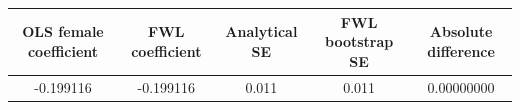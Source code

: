 \begin{tabular}{ccccc}
\toprule
OLS female coefficient & FWL coefficient & Analytical SE & FWL bootstrap SE & Absolute difference \\
\midrule
-0.199116 & -0.199116 & 0.011 & 0.011 & 0.00000000 \\
\bottomrule
\end{tabular}
